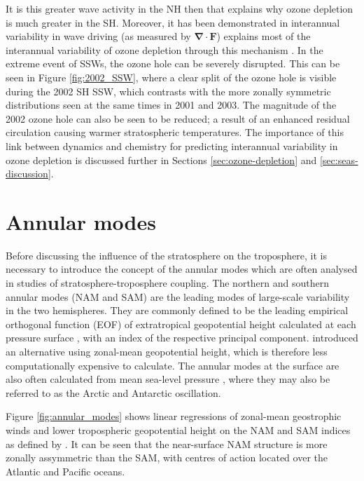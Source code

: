 It is this greater wave activity in the NH then that explains why ozone
depletion is much greater in the SH. Moreover, it has been demonstrated in
interannual variability in wave driving (as measured by
$\mathbf{\nabla\cdot F}$) explains most of the interannual variability of ozone
depletion through this mechanism \citep{Salby2012}. In the extreme event of
SSWs, the ozone hole can be severely disrupted. This can be seen in Figure
\ref{fig:2002_SSW}, where a clear split of the ozone hole is visible during the
2002 SH SSW, which contrasts with the more zonally symmetric distributions seen
at the same times in 2001 and 2003. The magnitude of the 2002 ozone hole can
also be seen to be reduced; a result of an enhanced residual circulation causing
warmer stratospheric temperatures. The importance of this link between dynamics
and chemistry for predicting interannual variability in ozone depletion is
discussed further in Sections \ref{sec:ozone-depletion} and
\ref{sec:seas-discussion}.

\section{Annular modes}

Before discussing the influence of the stratosphere on the troposphere, it is
necessary to introduce the concept of the annular modes which are often analysed
in studies of stratosphere-troposphere coupling. The northern and southern
annular modes (NAM and SAM) are the leading modes of large-scale variability in
the two hemispheres. They are commonly defined to be the leading empirical
orthogonal function (EOF) of extratropical geopotential height calculated at
each pressure surface \citep{Baldwin1999, Thompson2000a}, with an index of the
respective principal component. \citet{Baldwin2009} introduced an alternative
using zonal-mean geopotential height, which is therefore less computationally
expensive to calculate. The annular modes at the surface are also often
calculated from mean sea-level pressure \citep[e.g.,][]{Gong1999}, where they
may also be referred to as the Arctic and Antarctic oscillation.

Figure \ref{fig:annular_modes} shows linear regressions of zonal-mean
geostrophic winds and lower tropospheric geopotential height on the NAM and SAM
indices as defined by \citet{Thompson2000a}. It can be seen that the
near-surface NAM structure is more zonally assymmetric than the SAM, with
centres of action located over the Atlantic and Pacific oceans. 


